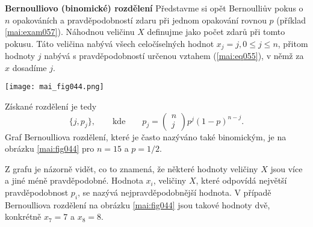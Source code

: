 \wikitextrule
\begin{example}\label{mai:exam065}
  \textbf{Bernoulliovo (binomické) rozdělení}\newline\small
  Představme si opět Bernoulliův pokus o \(n\) opakováních a pravděpodobností zdaru při jednom 
  opakování rovnou \(p\) (příklad \ref{mai:exam057}). Náhodnou veličinu \(X\) definujme jako počet 
  zdarů při tomto pokusu. Táto veličina nabývá všech celočíselných hodnot \(x_j = j, 0 \leq j \leq 
  n\), přitom hodnoty \(j\) nabývá s pravděpodobností určenou vztahem (\ref{mai:eq055}), v němž za 
  \(x\) dosadíme \(j\). 
  
  {\centering
   \captionsetup{type=figure}
   \texttt{[image: mai\_fig044.png]}
  \par}
  
  Získané rozdělení je tedy
  \begin{equation*}
    \lbrace j,p_j\rbrace, \qquad\text{kde}\qquad p_j = 
      \begin{pmatrix} n \\ j \end{pmatrix}p^j(1 - p)^{n-j}.
  \end{equation*}
  Graf Bernoulliova rozdělení, které je často nazýváno také binomickým, je na obrázku 
  \ref{mai:fig044} pro \(n = 15\) a \(p = 1/2\).
  
  Z grafu je názorně vidět, co to znamená, že některé hodnoty veličiny \(X\) jsou více a jiné méně 
  pravděpodobné. Hodnota \(x_i\), veličiny \(X\), které odpovídá největší pravděpodobnost \(p_i\), 
  se nazývá nejpravděpodobnější hodnota. V případě Bernoulliova rozdělení na obrázku 
  \ref{mai:fig044} jsou takové hodnoty dvě, konkrétně \(x_7 = 7\) a \(x_8 = 8\).
\normalsize
\end{example}